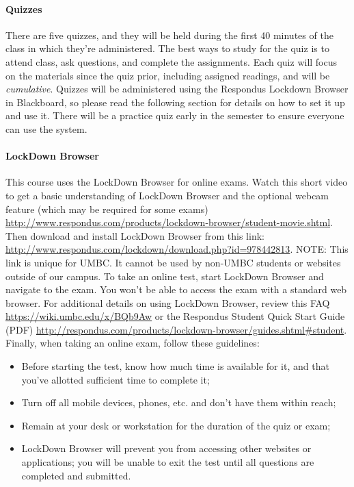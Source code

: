 \documentclass[letter,11pt]{article}
\begin{document}
\paragraph{Quizzes}There are five quizzes, and they will be held during the first 40 minutes of the class in which they're administered. The best ways to study for the quiz is to attend class, ask questions, and complete the assignments. Each quiz will focus on the materials since the quiz prior, including assigned readings, and will be \textit{cumulative}. Quizzes will be administered using the Respondus Lockdown Browser in Blackboard, so please read the following section for details on how to set it up and use it. There will be a practice quiz early in the semester to ensure everyone can use the system.

\paragraph{LockDown Browser}This course uses the LockDown Browser for online exams. Watch this short video to get a basic understanding of LockDown Browser and the optional webcam feature (which may be required for some exams) \url{http://www.respondus.com/products/lockdown-browser/student-movie.shtml}. Then download and install LockDown Browser from this link: \url{http://www.respondus.com/lockdown/download.php?id=978442813}. NOTE: This link is unique for UMBC. It cannot be used by non-UMBC students or websites outside of our campus. To take an online test, start LockDown Browser and navigate to the exam. You won't be able to access the exam with a standard web browser. For additional details on using LockDown Browser, review this FAQ \url{https://wiki.umbc.edu/x/BQb9Aw} or the Respondus Student Quick Start Guide (PDF) \url{http://respondus.com/products/lockdown-browser/guides.shtml#student}. Finally, when taking an online exam, follow these guidelines:
\begin{itemize}
\item Before starting the test, know how much time is available for it, and that you've allotted sufficient time to complete it;
\item Turn off all mobile devices, phones, etc. and don't have them within reach;
\item Remain at your desk or workstation for the duration of the quiz or exam;
\item LockDown Browser will prevent you from accessing other websites or applications; you will be unable to exit the test until all questions are completed and submitted.
\end{itemize}
\end{document}
